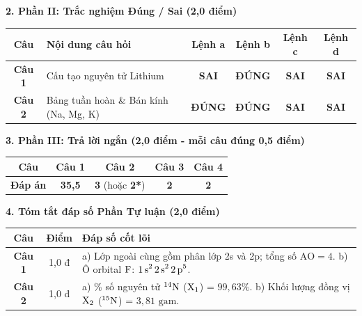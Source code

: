 \documentclass[11pt,a4paper]{article}
\begin{document}
\vspace{2pt}
\noindent
\textbf{\color{mainGreen}2. Phần II: Trắc nghiệm Đúng / Sai (2,0 điểm)}
\begin{center}
\renewcommand{\arraystretch}{1.2}
\begin{tabular}{|c|l|c|c|c|c|}
\hline
\rowcolor{tableGreen}
\textbf{Câu} & \textbf{Nội dung câu hỏi} & \textbf{Lệnh a} & \textbf{Lệnh b} & \textbf{Lệnh c} & \textbf{Lệnh d} \\
\hline
\textbf{Câu 1} & Cấu tạo nguyên tử Lithium & \textbf{SAI} & \textbf{\color{hfRed}ĐÚNG} & \textbf{SAI} & \textbf{SAI} \\
\hline
\textbf{Câu 2} & Bảng tuần hoàn \& Bán kính (Na, Mg, K) & \textbf{\color{hfRed}ĐÚNG} & \textbf{\color{hfRed}ĐÚNG} & \textbf{SAI} & \textbf{SAI} \\
\hline
\end{tabular}
\end{center}

\vspace{2pt}
\noindent
\textbf{\color{mainGreen}3. Phần III: Trả lời ngắn (2,0 điểm - mỗi câu đúng 0,5 điểm)}
\begin{center}
\renewcommand{\arraystretch}{1.2}
\begin{tabular}{|c|c|c|c|c|}
\hline
\rowcolor{tableGreen}
\textbf{Câu} & \textbf{Câu 1} & \textbf{Câu 2} & \textbf{Câu 3} & \textbf{Câu 4} \\
\hline
\textbf{Đáp án} & \textbf{\color{hfRed}35,5} & \textbf{\color{hfRed}3} (hoặc \textbf{2*}) & \textbf{\color{hfRed}2} & \textbf{\color{hfRed}2} \\
\hline
\end{tabular}
\end{center}

\vspace{2pt}
\noindent
\textbf{\color{mainGreen}4. Tóm tắt đáp số Phần Tự luận (2,0 điểm)}
\begin{center}
\renewcommand{\arraystretch}{1.2}
\begin{tabular}{|c|c|p{11.5cm}|}
\hline
\rowcolor{tableGreen}
\textbf{Câu} & \textbf{Điểm} & \textbf{Đáp số cốt lõi} \\
\hline
\textbf{Câu 1} & 1,0 đ & a) Lớp ngoài cùng gồm phân lớp 2s và 2p; tổng số $\text{AO} = 4$. \quad b) Ô orbital $\ce{F}$: $\ce{1s^2 2s^2 2p^5}$. \\
\hline
\textbf{Câu 2} & 1,0 đ & a) \% số nguyên tử $^{14}\ce{N}$ ($\ce{X_1}$) = $99,63\%$. \quad b) Khối lượng đồng vị $\ce{X_2}$ ($^{15}\ce{N}$) = $3,81\text{ gam}$. \\
\hline
\end{tabular}
\end{center}
\end{document}
